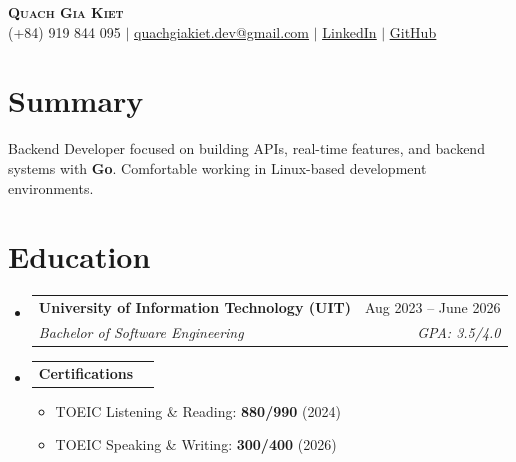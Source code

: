 \documentclass[letterpaper,11pt]{article}
\makeatletter
\newcommand{\resumeItem}[1]{
  \item\small{
    {#1 \vspace{-2pt}}
  }
}
\newcommand{\resumeSubheading}[4]{
  \vspace{-2pt}\item
    \begin{tabular*}{0.97\textwidth}[t]{l@{\extracolsep{\fill}}r}
      \textbf{#1} & #2 \\
      \textit{\small#3} & \textit{\small #4} \\
    \end{tabular*}\vspace{-7pt}
}
\newcommand{\resumeProjectHeading}[2]{
    \item
    \begin{tabular*}{0.97\textwidth}{l@{\extracolsep{\fill}}r}
      \small#1 & #2 \\
    \end{tabular*}\vspace{-7pt}
}
\newcommand{\resumeSubHeadingListStart}{\begin{itemize}[leftmargin=0.15in, label={}]}
\newcommand{\resumeSubHeadingListEnd}{\end{itemize}}
\newcommand{\resumeItemListStart}{\begin{itemize}}
\newcommand{\resumeItemListEnd}{\end{itemize}\vspace{-5pt}}
\makeatother
\begin{document}

\begin{center}
    \textbf{\Huge \scshape Quach Gia Kiet} \\ \vspace{1pt}
    \small (+84) 919 844 095 $|$ \href{mailto:quachgiakiet.dev@gmail.com}{\underline{quachgiakiet.dev@gmail.com}} $|$ 
    \href{https://www.linkedin.com/in/quachgiakiet}{\underline{LinkedIn}} $|$
    \href{https://github.com/giakiet05}{\underline{GitHub}}
\end{center}


\section{Summary}
 \small{
  Backend Developer focused on building APIs, real-time features, and backend systems with \textbf{Go}. Comfortable working in Linux-based development environments.
 }

\section{Education}
  \resumeSubHeadingListStart
    \resumeSubheading
      {University of Information Technology (UIT)}{Aug 2023 -- June 2026}
      {Bachelor of Software Engineering}{GPA: 3.5/4.0}
    
    \vspace{2pt} %
    
    \resumeProjectHeading
      {\textbf{Certifications}}{}
      \resumeItemListStart
        \resumeItem{TOEIC Listening \& Reading: \textbf{880/990} (2024)}
        \resumeItem{TOEIC Speaking \& Writing: \textbf{300/400} (2026)}
      \resumeItemListEnd
  \resumeSubHeadingListEnd

\end{document}
